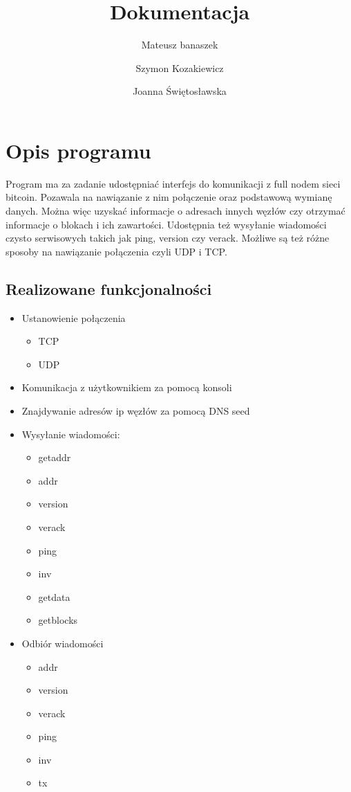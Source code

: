 

\title{Dokumentacja}
\author{Mateusz banaszek \and Szymon Kozakiewicz \and Joanna Świętosławska}

\maketitle
\section{Opis programu}
Program ma za zadanie udostępniać interfejs do komunikacji z full nodem sieci bitcoin. Pozawala na nawiązanie z nim połączenie oraz podstawową wymianę danych. Można więc uzyskać informacje o adresach innych węzłów czy otrzymać informacje o blokach i ich zawartości. Udostępnia też wysyłanie wiadomości czysto serwisowych takich jak ping, version czy verack. Możliwe są też różne sposoby na nawiązanie połączenia czyli UDP i TCP. 

\subsection{Realizowane funkcjonalności}

\begin{itemize}


\item Ustanowienie połączenia
\begin{itemize}
\item TCP
\item UDP
\end{itemize}

\item Komunikacja z użytkownikiem za pomocą konsoli
\item Znajdywanie adresów ip węzłów za pomocą DNS seed
\item Wysyłanie wiadomości:
\begin{itemize}
\item getaddr
\item addr
\item version
\item verack
\item ping
\item inv
\item getdata
\item getblocks
\end{itemize} 
\item Odbiór wiadomości
\begin{itemize}
\item addr
\item version
\item verack
\item ping
\item inv
\item tx

\end{itemize}
\end{itemize}

